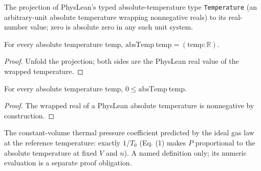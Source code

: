 \begin{definition}
\label{def:IPhO2026Problems_problem_IPhO_2026_4_A_5:absTemp}
The projection of PhysLean's typed absolute-temperature type
\texttt{Temperature} (an arbitrary-unit absolute temperature wrapping
nonnegative reals) to its real-number value; zero is absolute zero in any
such unit system.
\end{definition}

\begin{lemma}
\label{lem:IPhO2026Problems_problem_IPhO_2026_4_A_5:absTemp_eq_toReal}
For every absolute temperature $\mathrm{temp}$,
$\mathrm{absTemp}\ \mathrm{temp} = (\mathrm{temp} : \mathbb{R})$.
\end{lemma}
\begin{proof}
Unfold the projection; both sides are the PhysLean real value of the
wrapped temperature.
\end{proof}

\begin{lemma}
\label{lem:IPhO2026Problems_problem_IPhO_2026_4_A_5:absTemp_nonneg}
For every absolute temperature $\mathrm{temp}$,
$0 \le \mathrm{absTemp}\ \mathrm{temp}$.
\end{lemma}
\begin{proof}
The wrapped real of a PhysLean absolute temperature is nonnegative by
construction.
\end{proof}

\begin{definition}
\label{def:IPhO2026Problems_problem_IPhO_2026_4_A_5:idealThermalPressureCoefficient}
The constant-volume thermal pressure coefficient predicted by the ideal
gas law at the reference temperature: exactly $1/T_0$ (Eq. (1) makes $P$
proportional to the absolute temperature at fixed $V$ and $n$).  A named
definition only; its numeric evaluation is a separate proof obligation.
\end{definition}


